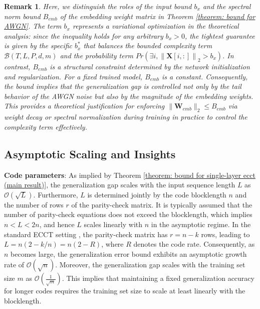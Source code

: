 \documentclass[lettersize,onecolumn]{IEEEtran}
\newtheorem{remark}{Remark}
\begin{document}
\begin{remark}
    Here, we distinguish the roles of the input bound $b_x$ and the spectral norm bound $B_{emb}$ of the embedding weight matrix in Theorem \ref{theorem: bound for AWGN}. The term $b_x$ represents a variational optimization in the theoretical analysis: since the inequality holds for any arbitrary $b_x>0$, the tightest guarantee is given by the specific $b_{x}^{*}$ that balances the bounded complexity term $\mathcal{B}(T, L, P, d, m)$ and the probability term $Pr(\exists i, \left\|\mathbf{X}[i,:]\right\|_2>b_x)$. In contrast, $B_{emb}$ is a structural constraint determined by the network initialization and regularization. For a fixed trained model, $B_{emb}$ is a constant. Consequently, the bound implies that the generalization gap is controlled not only by the tail behavior of the AWGN noise but also by the magnitude of the embedding weights. This provides a theoretical justification for enforcing $\|\mathbf{W}_{emb}\|_2\leq B_{emb}$ via weight decay \cite{krogh1991simpleweightdecay,loshchilov2017decoupledweightdecay} or spectral normalization \cite{miyato2018spectralnormalization} during training in practice to control the complexity term effectively.
\end{remark}

\subsection{Asymptotic Scaling and Insights}


\textbf{Code parameters}: As implied by Theorem \ref{theorem: bound for single-layer ecct (main result)}, the generalization gap scales with the input sequence length $L$ as $\mathcal{O}(\sqrt{L})$. Furthermore, $L$ is determined jointly by the code blocklength $n$ and the number of rows $r$ of the parity-check matrix. It is typically assumed that the number of parity-check equations does not exceed the blocklength, which implies $n<L<2n$, and hence $L$ scales linearly with $n$ in the asymptotic regime. In the standard ECCT setting \cite{choukroun2022ECCT}, the parity-check matrix has $r=n-k$ rows, leading to $L=n(2-k/n)=n(2-R)$, where $R$ denotes the code rate. Consequently, as $n$ becomes large, the generalization error bound exhibits an asymptotic growth rate of $\mathcal{O}(\sqrt{n})$. Moreover, the generalization gap scales with the training set size $m$ as $\mathcal{O}(\frac{1}{\sqrt{m}})$. This implies that maintaining a fixed generalization accuracy for longer codes requires the training set size to scale at least linearly with the blocklength.
\end{document}
